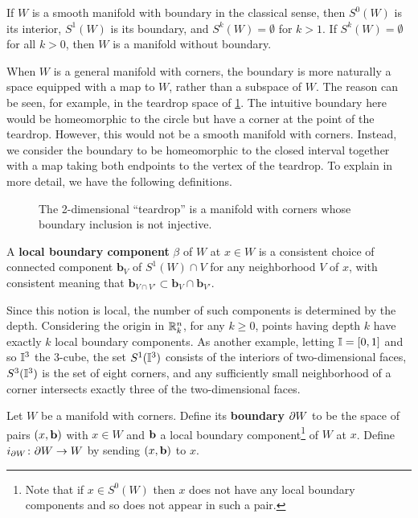 \begin{example}
	If $W$ is a smooth manifold with boundary in the classical sense, then $S^0(W)$ is its interior, $S^1(W)$ is its boundary, and $S^k(W) = \emptyset$ for $k>1$.
	If $S^k(W) = \emptyset$ for all $k>0$, then $W$ is a manifold without boundary.
\end{example}

When $W$ is a general manifold with corners, the boundary is more naturally a space equipped with a map to $W$, rather than a subspace of $W$.
The reason can be seen, for example, in the teardrop space of \cref{F: teardrop}.
The intuitive boundary here would be homeomorphic to the circle but have a corner at the point of the teardrop.
However, this would not be a smooth manifold with corners.
Instead, we consider the boundary to be homeomorphic to the closed interval together with a map taking both endpoints to the vertex of the teardrop.
To explain in more detail, we have the following definitions.

\begin{figure}[h]
	
	\caption{The 2-dimensional ``teardrop'' is a manifold with corners whose boundary inclusion is not injective.}
	\label{F: teardrop}
\end{figure}

\begin{definition}
	A \textbf{local boundary component} $\beta$ of $W$ at $x \in W$ is a consistent choice of connected component $\mathbf{b}_V$ of $S^1(W) \cap V$ for any neighborhood $V$ of $x$, with consistent meaning that $\mathbf{b}_{V \cap V'} \subset \mathbf{b}_{V} \cap \mathbf{b}_{V'}$.
\end{definition}

Since this notion is local, the number of such components is determined by the depth.
Considering the origin in $\mathbb{R}^n_k$, for any $k \geq 0$, points having depth $k$ have exactly $k$ local boundary components.
As another example, letting $\mathbb{I} = [0,1]$ and so $\mathbb{I}^3$ the 3-cube, the set $S^1(\mathbb{I}^3)$ consists of the interiors of two-dimensional faces, $S^3(\mathbb{I}^3)$ is the set of eight corners, and any sufficiently small neighborhood of a corner intersects exactly three of the two-dimensional faces.

\begin{definition}\label{D: MWC boundary}
	Let $W$ be a manifold with corners.
	Define its \textbf{boundary} $\partial W$ to be the space of pairs $(x, \mathbf{b})$ with $x \in W$ and $\mathbf{b}$ a local boundary component\footnote{Note that if $x \in S^0(W)$ then $x$ does not have any local boundary components and so does not appear in such a pair.} of $W$ at $x$.
	Define $i_{\partial W} \colon \partial W \to W$ by sending $(x,\mathbf{b})$ to $x$.
\end{definition}

